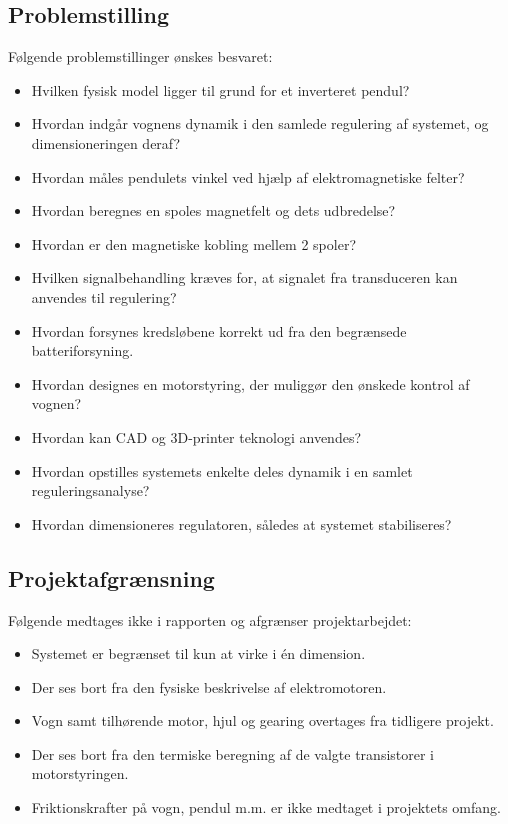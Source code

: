 \subsection{Problemstilling}
Følgende problemstillinger ønskes besvaret:
\begin{itemize}
\item Hvilken fysisk model ligger til grund for et inverteret pendul?
\item Hvordan indgår vognens dynamik i den samlede regulering af systemet, og dimensioneringen deraf?
\item Hvordan måles pendulets vinkel ved hjælp af elektromagnetiske felter?
\item Hvordan beregnes en spoles magnetfelt og dets udbredelse?
\item Hvordan er den magnetiske kobling mellem 2 spoler?
\item Hvilken signalbehandling kræves for, at signalet fra transduceren kan anvendes til regulering? 
\item Hvordan forsynes kredsløbene korrekt ud fra den begrænsede batteriforsyning.    
\item Hvordan designes en motorstyring, der muliggør den ønskede kontrol af vognen?
\item Hvordan kan CAD og 3D-printer teknologi anvendes?
\item Hvordan opstilles systemets enkelte deles dynamik i en samlet reguleringsanalyse?
\item Hvordan dimensioneres regulatoren, således at systemet stabiliseres?
\end{itemize}

\subsection{Projektafgrænsning}
Følgende medtages ikke i rapporten og afgrænser projektarbejdet:
\begin{itemize}
\item Systemet er begrænset til kun at virke i én dimension.
\item Der ses bort fra den fysiske beskrivelse af elektromotoren.
\item Vogn samt tilhørende motor, hjul og gearing overtages fra tidligere projekt.
\item Der ses bort fra den termiske beregning af de valgte transistorer i motorstyringen.
\item Friktionskrafter på vogn, pendul m.m. er ikke medtaget i projektets omfang.   
\end{itemize}

